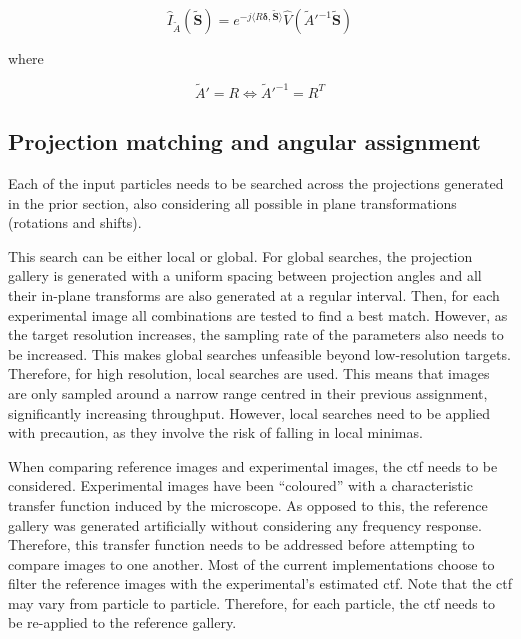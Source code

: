 \documentclass[../main.tex]{subfiles}
\begin{document}
\begin{equation}\label{eq:3:projection_fourier}
    \hat{I}_{\tilde{A}}(\bm{\tilde{S}}) = e^{-j\langle R\bm{\delta, \bm{\tilde{S}}}\rangle}\hat{V}(\tilde{A}'^{-1}\bm{\tilde{S}})
\end{equation}

where 

\begin{equation}\label{eq:3:projection_fourier_pose}
    \tilde{A}' = R \Leftrightarrow \tilde{A}'^{-1} = R^T
\end{equation}

\subsection{Projection matching and angular assignment}
Each of the input particles needs to be searched across the projections generated in the prior section, also considering all possible in plane transformations (rotations and shifts). 

This search can be either local or global. For global searches, the projection gallery is generated with a uniform spacing between projection angles and all their in-plane transforms are also generated at a regular interval. Then, for each experimental image all combinations are tested to find a best match. However, as the target resolution increases, the sampling rate of the parameters also needs to be increased. This makes global searches unfeasible beyond low-resolution targets. Therefore, for high resolution, local searches are used. This means that images are only sampled around a narrow range centred in their previous assignment, significantly increasing throughput\cite{cryosparc}\cite{scheres2021}. However, local searches need to be applied with precaution, as they involve the risk of falling in local minimas.

When comparing reference images and experimental images, the \gls{ctf} needs to be considered. Experimental images have been ``coloured'' with a characteristic transfer function induced by the microscope. As opposed to this, the reference gallery was generated artificially without considering any frequency response. Therefore, this transfer function needs to be addressed before attempting to compare images to one another. Most of the current implementations choose to filter the reference images with the experimental's estimated \gls{ctf}. Note that the \gls{ctf} may vary from particle to particle\cite{sorzano2017b}. Therefore, for each particle, the \gls{ctf} needs to be re-applied to the reference gallery.
\end{document}
